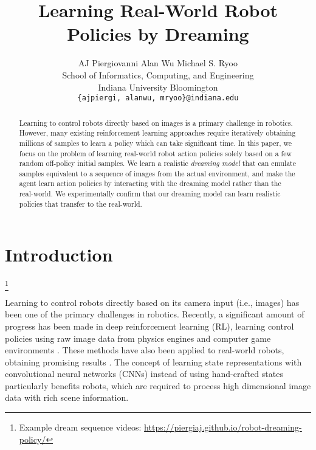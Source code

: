 \documentclass[letterpaper, 10 pt, conference]{ieeeconf}
\title{\LARGE \bf Learning Real-World Robot Policies by Dreaming}
\author{
  AJ Piergiovanni \hspace{1cm} Alan Wu \hspace{1cm} Michael S. Ryoo \\
  School of Informatics, Computing, and Engineering\\
  Indiana University Bloomington\\
  \texttt{\{ajpiergi, alanwu, mryoo\}@indiana.edu} \\
}
\newcommand\blfootnote[1]{%
  \begingroup
  \renewcommand\thefootnote{}\footnote{#1}%
  \addtocounter{footnote}{-1}%
  \endgroup
}
\begin{document}
\maketitle

\begin{abstract}
Learning to control robots directly based on images is a primary challenge in robotics. However, many existing reinforcement learning approaches require iteratively obtaining millions of samples to learn a policy which can take significant time. In this paper, we focus on the problem of learning real-world robot action policies solely based on a few random off-policy initial samples. We learn a realistic \emph{dreaming model} that can emulate samples equivalent to a sequence of images from the actual environment, and make the agent learn action policies by interacting with the dreaming model rather than the real-world. We experimentally confirm that our dreaming model can learn realistic policies that transfer to the real-world.
\end{abstract}


\section{Introduction}
\blfootnote{Example dream sequence videos: \href{https://piergiaj.github.io/robot-dreaming-policy/}{https://piergiaj.github.io/robot-dreaming-policy/}}

Learning to control robots directly based on its camera input (i.e., images) has been one of the primary challenges in robotics. Recently, a significant amount of progress has been made in deep reinforcement learning (RL), learning control policies using raw image data from physics engines and computer game environments \cite{mnih2013playing,heess2015learning}. These methods have also been applied to real-world robots, obtaining promising results \cite{finn2017deep,wahlstrom2015pixels}. The concept of learning state representations with convolutional neural networks (CNNs) instead of using hand-crafted states particularly benefits robots, which are required to process high dimensional image data with rich scene information.




\end{document}
